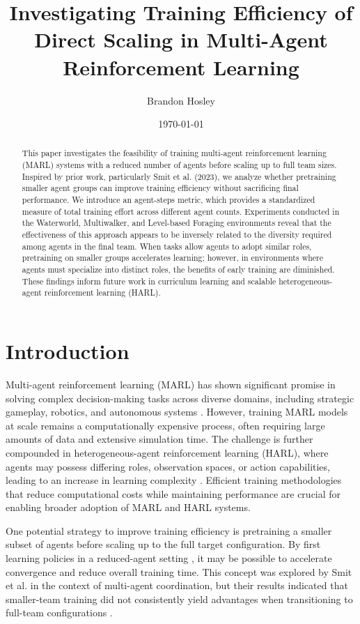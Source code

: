 \documentclass{article}
\title{Investigating Training Efficiency of Direct Scaling in Multi-Agent Reinforcement Learning}
\author{Brandon Hosley}
\date{\today}
\begin{document}
\maketitle

\begin{abstract}
    This paper investigates the feasibility of training multi-agent reinforcement learning (MARL) 
    systems with a reduced number of agents before scaling up to full team sizes. 
    Inspired by prior work, particularly Smit et al. (2023), 
    we analyze whether pretraining smaller agent groups can improve training efficiency 
    without sacrificing final performance. 
    We introduce an agent-steps metric, which provides a standardized measure of 
    total training effort across different agent counts.
    Experiments conducted in the Waterworld, Multiwalker, and Level-based Foraging environments 
    reveal that the effectiveness of this approach appears to be inversely related 
    to the diversity required among agents in the final team. 
    When tasks allow agents to adopt similar roles, 
    pretraining on smaller groups accelerates learning; 
    however, in environments where agents must specialize into distinct roles, 
    the benefits of early training are diminished. 
    These findings inform future work in curriculum learning and scalable 
    heterogeneous-agent reinforcement learning (HARL).
\end{abstract}

\section{Introduction}

Multi-agent reinforcement learning (MARL) has shown significant promise in solving complex 
decision-making tasks across diverse domains, including strategic gameplay, robotics, 
and autonomous systems \cite{silver2016, vinyals2019, berner2019}. 
However, training MARL models at scale remains a computationally expensive process, 
often requiring large amounts of data and extensive simulation time. 
The challenge is further compounded in heterogeneous-agent reinforcement learning (HARL), 
where agents may possess differing roles, observation spaces, or action capabilities, 
leading to an increase in learning complexity \cite{rizk2019, yang2021a}. 
Efficient training methodologies that reduce computational costs while maintaining 
performance are crucial for enabling broader adoption of MARL and HARL systems.


One potential strategy to improve training efficiency is pretraining a 
smaller subset of agents before scaling up to the full target configuration. 
By first learning policies in a reduced-agent setting , 
it may be possible to accelerate convergence and reduce overall training time. 
This concept was explored by Smit et al. in the context of multi-agent coordination, 
but their results indicated that smaller-team training did not consistently yield 
advantages when transitioning to full-team configurations \cite{smit2023}. 
\end{document}
